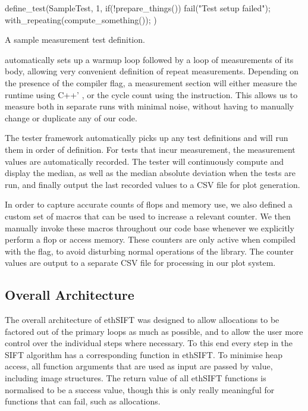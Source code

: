 \documentclass[letterpaper]{article}
\begin{document}
\begin{listing}[ht]
\begin{ccode}
define_test(SampleTest, 1, {
    if(!prepare_things())
      fail("Test setup failed");
    with_repeating(compute_something());
  })
\end{ccode}
\caption{A sample measurement test definition.}
\label{lst:sample-test}
\end{listing}

 automatically sets up a warmup loop followed by a loop of measurements of its body, allowing very convenient definition of repeat measurements. Depending on the presence of the  compiler flag, a measurement section will either measure the runtime using C++' , or the cycle count using the  instruction. This allows us to measure both in separate runs with minimal noise, without having to manually change or duplicate any of our code.

The tester framework automatically picks up any test definitions and will run them in order of definition. For tests that incur measurement, the measurement values are automatically recorded. The tester will continuously compute and display the median, as well as the median absolute deviation when the tests are run, and finally output the last recorded values to a CSV file for plot generation.

In order to capture accurate counts of flops and memory use, we also defined a custom set of macros that can be used to increase a relevant counter. We then manually invoke these macros throughout our code base whenever we explicitly perform a flop or access memory. These counters are only active when compiled with the  flag, to avoid disturbing normal operations of the library. The counter values are output to a separate CSV file for processing in our plot system.

\subsection*{Overall Architecture}\label{sec:architecture}
The overall architecture of ethSIFT was designed to allow allocations to be factored out of the primary loops as much as possible, and to allow the user more control over the individual steps where necessary. To this end every step in the SIFT algorithm has a corresponding function in ethSIFT. To minimise heap access, all function arguments that are used as input are passed by value, including image structures. The return value of all ethSIFT functions is normalised to be a success value, though this is only really meaningful for functions that can fail, such as allocations.
\end{document}
